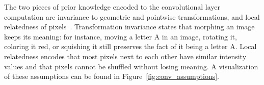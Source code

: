 \documentclass[english,twoside,openright]{UH_DS_MSc}
\begin{document}
The two pieces of prior knowledge encoded to the convolutional layer computation
 are invariance to geometric and pointwise transformations, and local relatedness of pixels~\cite{princebook}.
Transformation invariance states that morphing an image keeps its meaning: for instance,
 moving a letter A in an image, 
rotating it, coloring it red, or squishing it still preserves the fact of it being a letter A. Local relatedness 
encodes that most pixels next to each other have similar intensity values and that pixels cannot be shuffled without losing meaning. A visualization of these assumptions can be found in Figure~\ref{fig:conv_assumptions}.

\begin{figure}[ht]
    \centering
\end{figure}
\end{document}
